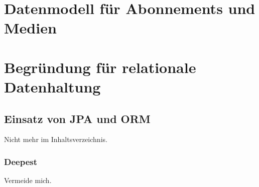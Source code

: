 \section{Datenmodell für Abonnements und Medien}

\section{Begründung für relationale Datenhaltung}

\subsection{Einsatz von JPA und ORM}
Nicht mehr im Inhaltsverzeichnis.

\subsubsection{Deepest}
Vermeide mich.